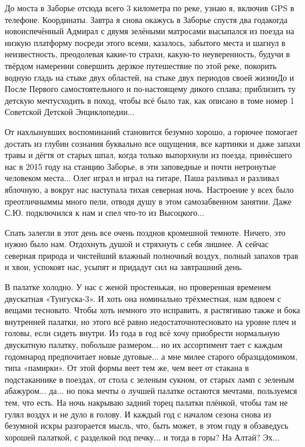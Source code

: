 До моста в Заборье отсюда всего 3 километра по реке, узнаю я, включив GPS в телефоне. Координаты\mdash \CoordsLidSeventeenNearZaborie. Завтра я снова окажусь в Заборье спустя два года\mdash когда новоиспечённый Адмирал с двумя зелёными матросами высыпался из поезда на низкую платформу посреди этого всеми, казалось, забытого места и шагнул в неизвестность, преодолевая какие-то страхи, какую-то неуверенность, будучи в твёрдом намерении совершить дерзкое путешествие по этой реке, покорить водную гладь на стыке двух областей, на стыке двух периодов своей жизни\mdash До и После Первого самостоятельного и по-настоящему дикого сплава; приблизить ту детскую мечту\mdash сходить в поход, чтобы всё было так, как описано в томе номер 1 Советской Детской Энциклопедии$\ldots$ 

От нахлынувших воспоминаний становится безумно хорошо, а горючее помогает достать из глубин сознания буквально все ощущения, все картинки и даже запахи травы и дёгтя от старых шпал, когда только выпорхнули из поезда, принёсшего нас в 2015 году на станцию Заборье, в эти заповедные и почти нетронутые человеком места$\ldots$ Олег играл и играл на гитаре, Паша разливал и разливал яблочную, а вокруг нас наступала тихая северная ночь. Настроение у всех было преотличным\mdash мы много пели, отводя душу в этом самозабвенном занятии. Даже С.Ю. подключился к нам и спел что-то из Высоцкого$\ldots$

Спать залегли в этот день все очень поздно\mdash в кромешной темноте. Ничего, это нужно было нам. Отдохнуть душой и стряхнуть с себя лишнее. А сейчас северная природа и чистейший влажный полночный воздух, полный запахов трав и хвои, успокоят нас, усыпят и придадут сил на завтрашний день. 

В палатке холодно. У нас с женой простенькая, но проверенная временем двускатная «Тунгуска-3». И хоть она номинально трёхместная, нам вдвоем с вещами тесновато. Чтобы хоть немного это исправить, я растягиваю также и бока внутренней палатки, но этого всё равно недостаточно\mdash тесновато на уровне плеч и головы, если сидеть внутри. Из года в год всё хочу приобрести нормальную двускатную палатку, побольше размером$\ldots$ но их ассортимент тает с каждым годом\mdash народ предпочитает новые дуговые$\ldots$ а мне милее старого образца\mdash домиком, типа «памирки». От этой формы веет тем же, чем веет от стакана в подстаканнике в поездах, от стола с зеленым сукном, от старых ламп с зеленым абажуром$\ldots$ да$\ldots$ но пока мечты о лучшей палатке остаются мечтами, пользуемся тем, что есть. На ночь накрываю задний торец палатки плёнкой, чтобы там не гулял воздух и не дуло в голову. И каждый год с началом сезона снова из безумной искры разгорается мысль, что, быть может, в этом году я обзаведусь хорошей палаткой, с разделкой под печку$\ldots$ и тогда в горы? На Алтай? Эх$\ldots$

